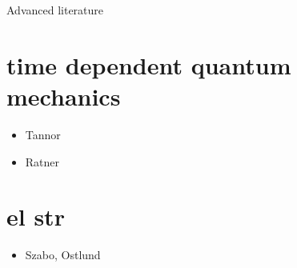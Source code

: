 Advanced literature

\section*{time dependent quantum mechanics}
\begin{itemize}

\item Tannor

\item Ratner

\end{itemize}

\section*{el str}
\begin{itemize}

\item Szabo, Ostlund

\end{itemize}



